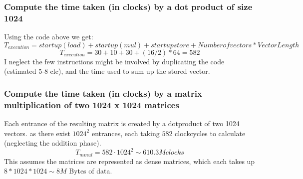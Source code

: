 \documentclass[a4paper,10pt]{article}
\begin{document}
\subsubsection{Compute the time taken (in clocks) by a dot product of size 1024}
Using the code above we get:
$$ T_{execution} = startup(load) + startup(mul) + startup store + Number of vectors * Vector Length $$
$$ T_{execution} = 30 + 10 + 30 + (16/2) * 64  = 582 $$
I neglect the few instructions might be involved by duplicating the code (estimated 5-8 clc), and the time used to sum up the stored vector.


\subsubsection{Compute the time taken (in clocks) by a matrix multiplication of two 1024 x 1024 matrices}
Each entrance of the resulting matrix is created by a dotproduct of two 1024 vectors. as there exist $1024^2$ entrances, each taking $582$ clockcycles to calculate (neglecting the addition phase).
$$T_{mmul} = 582 \cdot 1024^2 \sim 610.3 M clocks $$
This assumes the matrices are represented as dense matrices, which each takes up $8*1024*1024 \sim 8 M $ Bytes of data.
\end{document}
